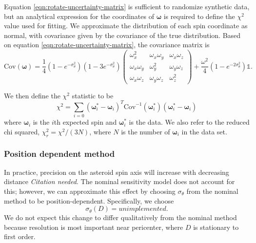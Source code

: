 \documentclass[11pt]{article}
\newcommand{\parens}[1]{\left( #1 \right)}
\newcommand{\jtd}[1]{{\color{red}\textit{#1}}}
\begin{document}
Equation \ref{eqn:rotate-uncertainty-matrix} is sufficient to randomize synthetic data, but an analytical expression for the coordinates of $\bm \omega$ is required to define the $\chi^2$ value used for fitting. We approximate the distribution of each spin coordinate as normal, with covariance given by the covariance of the true distribution. Based on equation \ref{eqn:rotate-uncertainty-matrix}, the covariance matrix is
\begin{equation}
\text{Cov}(\bm \omega) = \frac{1}{4}\parens{1-e^{-\sigma_\theta^2}} \parens{1-3e^{-\sigma_\theta^2}}\parens{\begin{matrix}
\omega_x^2 & \omega_x \omega_y& \omega_x \omega_z\\
\omega_x \omega_y & \omega_y^2 & \omega_y \omega_z\\
\omega_x \omega_z & \omega_y \omega_z& \omega_z^2
\end{matrix}} +  \frac{\omega^2}{4}\parens{1 - e^{-2\sigma_\theta^2}} \mathbb{1}.
\label{eqn:rotate-uncertainty-var}
\end{equation}

We then define the $\chi^2$ statistic to be
\begin{equation}
\chi^2 = \sum_{i=0} (\bm \omega_i^* - \bm \omega_i)^T\text{Cov}^{-1}(\bm\omega^*_i)(\bm \omega_i^* - \bm \omega_i)
\end{equation}
where $\bm \omega_i$ is the $i$th expected spin and $\bm \omega_i^*$ is the data. We also refer to the reduced chi squared, $\chi^2_r = \chi^2 / (3N)$, where $N$ is the number of $\bm \omega_i$ in the data set.


\subsubsection{Position dependent method}
In practice, precision on the asteroid spin axis will increase with decreasing distance \jtd{Citation needed}. The nominal sensitivity model does not account for this; however, we can approximate this effect by choosing $\sigma_\theta$ from the nominal method to be position-dependent. Specifically, we choose
\begin{equation}
\sigma_\theta(D) = unimplemented.
\label{eqn:pos-dependent-sensitivity}
\end{equation}
We do not expect this change to differ qualitatively from the nominal method because resolution is most important near pericenter, where $D$ is stationary to first order.
\end{document}
